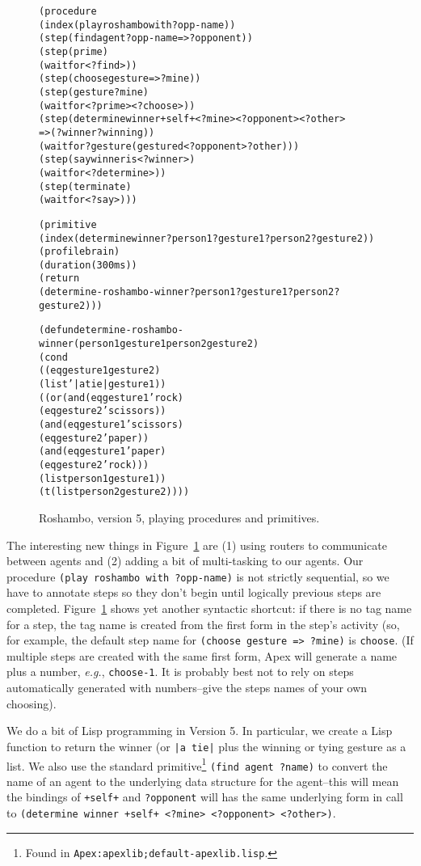 \documentclass[12pt]{article}
\newcommand{\ic}{\texttt}
\newenvironment{code}%
   {\begin{alltt}}%
   {\end{alltt}}
\newenvironment{float}%
   {\begin{center}}%
   {\end{center}
   }
\begin{document}
\begin{figure}
\begin{float}
\begin{code}
(procedure 
  (index (play roshambo with ?opp-name))
  (step (find agent ?opp-name => ?opponent))
  (step (prime)
        (waitfor <?find>))
  (step (choose gesture => ?mine))
  (step (gesture ?mine)
        (waitfor <?prime> <?choose>))
  (step (determine winner +self+ <?mine> <?opponent> <?other> 
         => (?winner ?winning))
	(waitfor ?gesture (gestured <?opponent> ?other)))
  (step (say winner is <?winner>)
	(waitfor <?determine>))
  (step (terminate)
	(waitfor <?say>)))

(primitive 
  (index (determine winner ?person1 ?gesture1 ?person2 ?gesture2))
  (profile brain)
  (duration (300 ms))
  (return 
   (determine-roshambo-winner ?person1 ?gesture1 ?person2 ?gesture2)))

(defun determine-roshambo-winner (person1 gesture1 person2 gesture2)
  (cond
   ((eq gesture1 gesture2)
    (list '|a tie| gesture1))
   ((or (and (eq gesture1 'rock)
             (eq gesture2 'scissors))
        (and (eq gesture1 'scissors)
             (eq gesture2 'paper))
        (and (eq gesture1 'paper)
             (eq gesture2 'rock)))
    (list person1 gesture1))
   (t (list person2 gesture2))))
\end{code}
\end{float}
\caption{Roshambo, version 5, playing procedures and primitives.\label{fig.roshambo.5b}}
\end{figure}

The interesting new things in Figure~\ref{fig.roshambo.5b} are (1) using routers to communicate between agents and (2) adding a bit of multi-tasking to our agents. Our procedure \ic{(play roshambo with ?opp-name)} is not strictly sequential, so we have to annotate steps so they don't begin until logically previous steps are completed. Figure~\ref{fig.roshambo.5b} shows yet another syntactic shortcut: if there is no tag name for a step, the tag name is created from the first form in the step's activity (so, for example, the default step name for \ic{(choose gesture => ?mine)} is \ic{choose}. (If multiple steps are created with the same first form, Apex will generate a name plus a number, \textit{e.g.}, \ic{choose-1}. It is probably best not to rely on steps automatically generated with numbers--give the steps names of your own choosing). 

We do a bit of Lisp programming in Version 5. In particular, we create a Lisp function to return the winner (or \ic{|a tie|} plus the winning or tying gesture as a list. We also use the standard primitive\footnote{Found in \ic{Apex:apexlib;default-apexlib.lisp}.} \ic{(find agent ?name)} to convert the name of an agent to the underlying data structure for the agent--this will mean the bindings of \ic{+self+} and \ic{?opponent} will has the same underlying form in call to \ic{(determine winner +self+ <?mine> <?opponent> <?other>)}.
\end{document}
